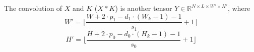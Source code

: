 The convolution of $X$ and $K$ ($X*K$) is another tensor $Y\in \mathbb{R}^{N\times L\times W' \times H'}$, where~\cite{conv2dTorch} 
\[
    W' = \displaystyle \Big\lfloor\frac{W  + 2 \cdot p_1 - d_1 \cdot (W_k - 1) - 1}{s_1} + 1\Big\rfloor    
\]
\[
    H' = \displaystyle \Big\lfloor\frac{H  + 2 \cdot p_0 - d_0 \cdot (H_k - 1) - 1}{s_0} + 1\Big\rfloor       
\]

\begin{figure}[h]
    \begin{center}

\end{center}
\end{figure}
